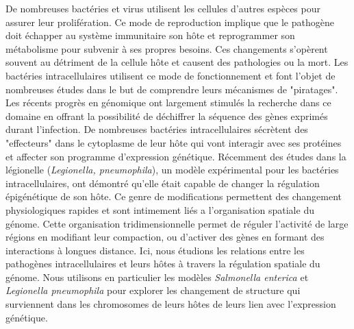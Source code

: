 De nombreuses bactéries et virus utilisent les cellules d'autres espèces pour assurer leur prolifération. Ce mode de reproduction implique que le pathogène doit échapper au système immunitaire son hôte et reprogrammer son métabolisme pour subvenir à ses propres besoins. Ces changements s'opèrent souvent au détriment de la cellule hôte et causent des pathologies ou la mort. Les bactéries intracellulaires utilisent ce mode de fonctionnement et font l'objet de nombreuses études dans le but de comprendre leurs mécanismes de "piratages". Les récents progrès en génomique ont largement stimulés la recherche dans ce domaine en offrant la possibilité de déchiffrer la séquence des gènes exprimés durant l'infection. De nombreuses bactéries intracellulaires sécrètent des "effecteurs" dans le cytoplasme de leur hôte qui vont interagir avec ses protéines et affecter son programme d'expression génétique. Récemment des études dans la légionelle (\textit{Legionella, pneumophila}), un modèle expérimental pour les bactéries intracellulaires, ont démontré qu'elle était capable de changer la régulation épigénétique de son hôte. Ce genre de modifications permettent des changement physiologiques rapides et sont intimement liés a l'organisation spatiale du génome. Cette organisation tridimensionnelle permet de réguler l'activité de large régions en modifiant leur compaction, ou d'activer des gènes en formant des interactions à longues distance. Ici, nous étudions les relations entre les pathogènes intracellulaires et leurs hôtes à travers la régulation spatiale du génome. Nous utilisons en particulier les modèles \textit{Salmonella enterica } et \textit{Legionella pneumophila} pour explorer les changement de structure qui surviennent dans les chromosomes de leurs hôtes de leurs lien avec l'expression génétique.
